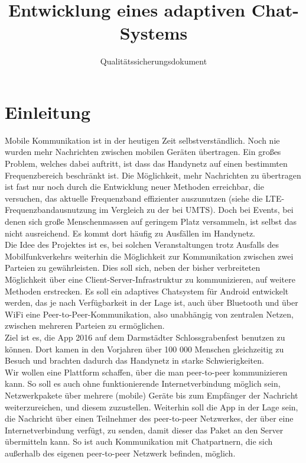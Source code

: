 \documentclass[accentcolor=tud0b,12pt,paper=a4]{tudreport}
\title{Entwicklung eines adaptiven Chat-Systems}
\subtitle{Qualitätssicherungsdokument}
\begin{document}
  \maketitle
  \tableofcontents

  \chapter{Einleitung}
    Mobile Kommunikation ist in der heutigen Zeit selbstverständlich. Noch nie wurden mehr Nachrichten zwischen mobilen Geräten übertragen. Ein großes Problem, welches dabei auftritt, ist dass das Handynetz auf einen bestimmten Frequenzbereich beschränkt ist. Die Möglichkeit, mehr Nachrichten zu übertragen ist fast nur noch durch die Entwicklung neuer Methoden erreichbar, die versuchen, das aktuelle Frequenzband effizienter auszunutzen (siehe die LTE-Frequenzbandausnutzung im Vergleich zu der bei UMTS). Doch bei Events, bei denen sich große Menschenmassen auf geringem Platz versammeln, ist selbst das nicht ausreichend. Es kommt dort häufig zu Ausfällen im Handynetz. \\

    Die Idee des Projektes ist es, bei solchen Veranstaltungen trotz Ausfalls des Mobilfunkverkehrs weiterhin die Möglichkeit zur Kommunikation zwischen zwei Parteien zu gewährleisten. Dies soll sich, neben der bisher verbreiteten Möglichkeit über eine Client-Server-Infrastruktur zu kommunizieren, auf weitere Methoden erstrecken. Es soll ein adaptives Chatsystem für Android entwickelt werden, das je nach Verfügbarkeit in der Lage ist, auch über Bluetooth und über WiFi eine Peer-to-Peer-Kommunikation, also unabhängig von zentralen Netzen, zwischen mehreren Parteien zu ermöglichen. \\

    Ziel ist es, die App 2016 auf dem Darmstädter Schlossgrabenfest benutzen zu können. Dort kamen in den Vorjahren über 100 000 Menschen gleichzeitig zu Besuch und brachten dadurch das Handynetz in starke Schwierigkeiten.\\

    Wir wollen eine Plattform schaffen, über die man peer-to-peer kommunizieren kann. So soll es auch ohne funktionierende Internetverbindung möglich sein, Netzwerkpakete über mehrere (mobile) Geräte bis zum Empfänger der Nachricht weiterzureichen, und diesem zuzustellen. Weiterhin soll die App in der Lage sein, die Nachricht über einen Teilnehmer des peer-to-peer Netzwerkes, der über eine Internetverbindung verfügt, zu senden, damit dieser das Paket an den Server übermitteln kann. So ist auch Kommunikation mit Chatpartnern, die sich außerhalb des eigenen peer-to-peer Netzwerk befinden, möglich.\\
\end{document}
